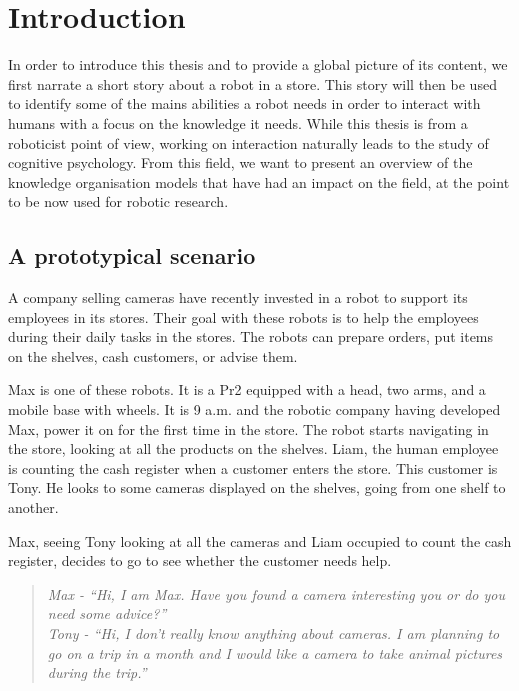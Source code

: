 
\ifdefined{}
\else
\setcounter{chapter}{0} %
\dominitoc
\faketableofcontents
\fi

\chapter{Introduction}
\minitoc

In order to introduce this thesis and to provide a global picture of its content, we first narrate a short story about a robot in a store. This story will then be used to identify some of the mains abilities a robot needs in order to interact with humans with a focus on the knowledge it needs. While this thesis is from a roboticist point of view, working on interaction naturally leads to the study of cognitive psychology. From this field, we want to present an overview of the knowledge organisation models that have had an impact on the field, at the point to be now used for robotic research.

\section{A prototypical scenario}

A company selling cameras have recently invested in a robot to support its employees in its stores. Their goal with these robots is to help the employees during their daily tasks in the stores. The robots can prepare orders, put items on the shelves, cash customers, or advise them.

Max is one of these robots. It is a Pr2 equipped with a head, two arms, and a mobile base with wheels. It is 9 a.m. and the robotic company having developed Max, power it on for the first time in the store. The robot starts navigating in the store, looking at all the products on the shelves. Liam, the human employee is counting the cash register when a customer enters the store. This customer is Tony. He looks to some cameras displayed on the shelves, going from one shelf to another.

Max, seeing Tony looking at all the cameras and Liam occupied to count the cash register, decides to go to see whether the customer needs help.

\begin{quote} 
\centering 
\textit{
Max - ``Hi, I am Max. Have you found a camera interesting you or do you need some advice?'' \\
Tony - ``Hi, I don't really know anything about cameras. I am planning to go on a trip in a month and I would like a camera to take animal pictures during the trip.'' }
\end{quote}

